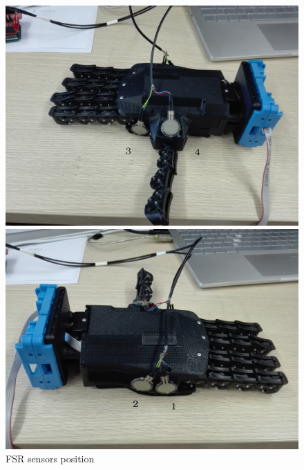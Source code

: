 \begin{figure}[h]
  \centering
  \begin{minipage}[b]{0.4\textwidth}
    \includegraphics[width=\textwidth]{Figure/qbhand1.jpg}
    
  \end{minipage}
  \hfill
  \begin{minipage}[b]{0.4\textwidth}
    \includegraphics[width=\textwidth]{Figure/qbhand2.jpg}
  \end{minipage}
  \label{fig:sensorsONhand}
  \caption{FSR sensors position}
\end{figure}

